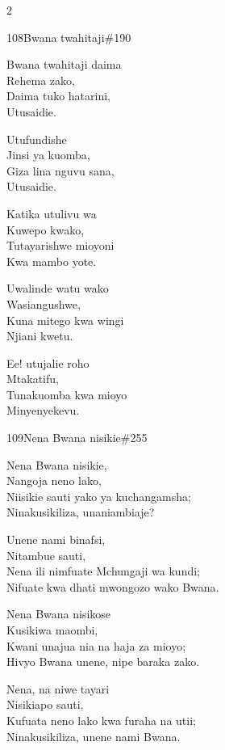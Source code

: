 \begin{multicols}{2}
\begin{hymn}{108}{Bwana twahitaji}{\#190}
\begin{stanza}
Bwana twahitaji daima\\
Rehema zako,\\
Daima tuko hatarini,\\
Utusaidie.
\end{stanza}
\begin{chorus}
Utufundishe\\
Jinsi ya kuomba,\\
Giza lina nguvu sana,\\
Utusaidie.
\end{chorus}
\begin{stanza}
Katika utulivu wa\\
Kuwepo kwako,\\
Tutayarishwe mioyoni\\
Kwa mambo yote.
\end{stanza}
\begin{stanza}
Uwalinde watu wako\\
Wasiangushwe,\\
Kuna mitego kwa wingi\\
Njiani kwetu.
\end{stanza}
\begin{stanza}
Ee! utujalie roho\\
Mtakatifu,\\
Tunakuomba kwa mioyo\\
Minyenyekevu.
\end{stanza}
\end{hymn}

\begin{hymn}{109}{Nena Bwana nisikie}{\#255}
\begin{stanza}
Nena Bwana nisikie,\\
Nangoja neno lako,\\
Niisikie sauti yako ya kuchangamsha;\\
Ninakusikiliza, unaniambiaje?
\end{stanza}
\begin{stanza}
Unene nami binafsi,\\
Nitambue sauti,\\
Nena ili nimfuate Mchungaji wa kundi;\\
Nifuate kwa dhati mwongozo wako Bwana.
\end{stanza}
\begin{stanza}
Nena Bwana nisikose\\
Kusikiwa maombi,\\
Kwani unajua nia na haja za mioyo;\\
Hivyo Bwana unene, nipe baraka zako.
\end{stanza}
\begin{stanza}
Nena, na niwe tayari\\
Nisikiapo sauti,\\
Kufuata neno lako kwa furaha na utii;\\
Ninakusikiliza, unene nami Bwana.
\end{stanza}
\end{hymn}


\end{multicols}
